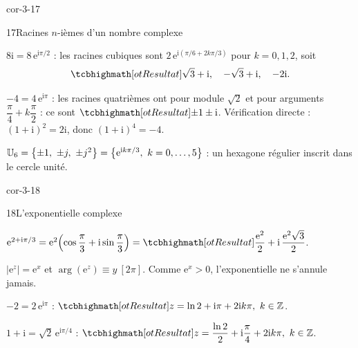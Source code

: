 \begin{blocLivre}{cor-3-17}
\begin{corrige}{17}{Racines $n$-ièmes d'un nombre complexe}
\begin{questions}
  \item $8\mathrm{i}=8\,\mathrm{e}^{\mathrm{i}\pi/2}$ : les racines cubiques sont
    $2\,\mathrm{e}^{\mathrm{i}(\pi/6+2k\pi/3)}$ pour $k=0,1,2$, soit
    \[
      \res{\sqrt3+\mathrm{i},\quad -\sqrt3+\mathrm{i},\quad -2\mathrm{i}}.
    \]
  \item $-4=4\,\mathrm{e}^{\mathrm{i}\pi}$ : les racines quatrièmes ont pour module
    $\sqrt2$ et pour arguments $\dfrac{\pi}{4}+k\dfrac{\pi}{2}$ :
    ce sont $\res{\pm1\pm\mathrm{i}}$. Vérification directe :
    $(1+\mathrm{i})^{2}=2\mathrm{i}$, donc $(1+\mathrm{i})^{4}=-4$.
  \item $\mathbb{U}_6=\left\{\pm1,\ \pm j,\ \pm j^{2}\right\}
    =\bigl\{\mathrm{e}^{\mathrm{i}k\pi/3},\ k=0,\dots,5\bigr\}$ : un hexagone
    régulier inscrit dans le cercle unité.
\end{questions}
\end{corrige}
\end{blocLivre}

\begin{blocLivre}{cor-3-18}
\begin{corrige}{18}{L'exponentielle complexe}
\begin{questions}
  \item $\mathrm{e}^{2+\mathrm{i}\pi/3}=\mathrm{e}^{2}\Bigl(\cos\dfrac{\pi}{3}
    +\mathrm{i}\sin\dfrac{\pi}{3}\Bigr)
    =\res{\dfrac{\mathrm{e}^{2}}{2}+\mathrm{i}\,\dfrac{\mathrm{e}^{2}\sqrt3}{2}}$.
  \item $|\mathrm{e}^{z}|=\mathrm{e}^{x}$ et $\arg(\mathrm{e}^{z})\equiv y\ [2\pi]$.
    Comme $\mathrm{e}^{x}>0$, l'exponentielle ne s'annule jamais.
  \item $-2=2\,\mathrm{e}^{\mathrm{i}\pi}$ :
    $\res{z=\ln2+\mathrm{i}\pi+2\mathrm{i}k\pi,\ k\in\Z}$.
  \item $1+\mathrm{i}=\sqrt2\,\mathrm{e}^{\mathrm{i}\pi/4}$ :
    $\res{z=\dfrac{\ln2}{2}+\mathrm{i}\dfrac{\pi}{4}+2\mathrm{i}k\pi,\ k\in\Z}$.
\end{questions}
\end{corrige}
\end{blocLivre}

